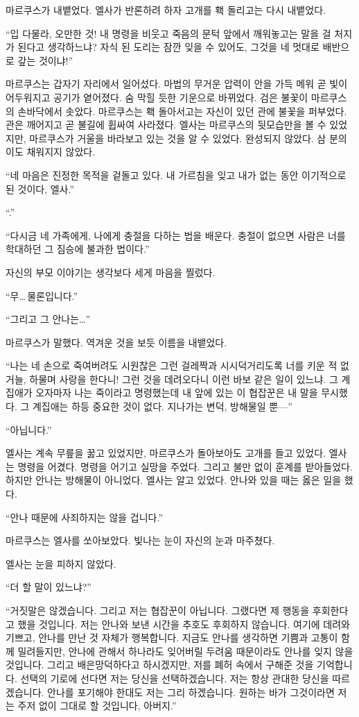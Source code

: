 마르쿠스가 내뱉었다. 엘사가 반론하려 하자 고개를 홱 돌리고는 다시 내뱉었다.

``입 다물라, 오만한 것! 내 명령을 비웃고 죽음의 문턱 앞에서 깨워놓고는 말을 걸 처지가 된다고 생각하느냐? 자식 된 도리는 잠깐 잊을 수 있어도, 그것을 네 멋대로 배반으로 갚는 것이냐!''

마르쿠스는 갑자기 자리에서 일어섰다. 마법의 무거운 압력이 안을 가득 메워 곧 빛이 어두워지고 공기가 옅어졌다. 숨 막힐 듯한 기운으로 바뀌었다. 검은 불꽃이 마르쿠스의 손바닥에서 솟았다. 마르쿠스는 홱 돌아서고는 자신이 있던 관에 불꽃을 퍼부었다. 관은 깨어지고 곧 불길에 휩싸여 사라졌다. 엘사는 마르쿠스의 뒷모습만을 볼 수 있었지만, 마르쿠스가 거울을 바라보고 있는 것을 알 수 있었다. 완성되지 않았다. 삼 분의 이도 채워지지 않았다.

``네 마음은 진정한 목적을 겉돌고 있다. 내 가르침을 잊고 내가 없는 동안 이기적으로 된 것이다, 엘사.''

``.''

``다시금 네 가족에게, 나에게 충절을 다하는 법을 배운다. 충절이 없으면 사람은 너를 학대하던 그 짐승에 불과한 법이다.''

자신의 부모 이야기는 생각보다 세게 마음을 찔렀다.

``무\ldots\,물론입니다.''

``그리고 그 안나는\ldots''

마르쿠스가 말했다. 역겨운 것을 보듯 이름을 내뱉었다.

``나는 네 손으로 죽여버려도 시원찮은 그런 걸레짝과 시시덕거리도록 너를 키운 적 없거늘, 하물며 사랑을 한다니! 그런 것을 데려오다니 이런 바보 같은 일이 있느냐. 그 계집애가 오자마자 나는 죽이라고 명령했는데 내 앞에 있는 이 협잡꾼은 내 말을 무시했다. 그 계집애는 하등 중요한 것이 없다. 지나가는 변덕, 방해물일 뿐—''

``아닙니다.''

엘사는 계속 무릎을 꿇고 있었지만, 마르쿠스가 돌아보아도 고개를 들고 있었다. 엘사는 명령을 어겼다. 명령을 어기고 실망을 주었다. 그리고 불만 없이 훈계를 받아들었다. 하지만 안나는 방해물이 아니었다. 엘사는 알고 있었다. 안나와 있을 때는 옳은 일을 했다.

``안나 때문에 사죄하지는 않을 겁니다.''

마르쿠스는 엘사를 쏘아보았다. 빛나는 눈이 자신의 눈과 마주쳤다.

엘사는 눈을 피하지 않았다.

``더 할 말이 있느냐?''

``거짓말은 않겠습니다. 그리고 저는 협잡꾼이 아닙니다. 그랬다면 제 행동을 후회한다고 했을 것입니다. 저는 안나와 보낸 시간을 추호도 후회하지 않습니다. 여기에 데려와 기쁘고, 안나를 만난 것 자체가 행복합니다. 지금도 안나를 생각하면 기쁨과 고통이 함께 밀려들지만, 안나에 관해서 하나라도 잊어버릴 두려움 때문이라도 안나를 잊지 않을 것입니다. 그리고 배은망덕하다고 하시겠지만, 저를 폐허 속에서 구해준 것을 기억합니다. 선택의 기로에 선다면 저는 당신을 선택하겠습니다. 저는 항상 관대한 당신을 따르겠습니다. 안나를 포기해야 한대도 저는 그리 하겠습니다. 원하는 바가 그것이라면 저는 주저 없이 그대로 할 것입니다, 아버지.''

